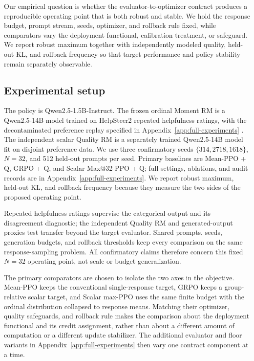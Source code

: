 \documentclass{article}
\theoremstyle{definition}
\theoremstyle{remark}
\begin{document}
Our empirical question is whether the evaluator-to-optimizer contract
produces a reproducible operating point that is both robust and stable.
We hold the response budget, prompt stream, seeds, optimizer, and rollback rule
fixed, while comparators vary the deployment functional, calibration
treatment, or safeguard. We report robust maximum together with
independently modeled quality, held-out KL, and rollback frequency so that target
performance and policy stability remain separately observable.

\subsection{Experimental setup}
The policy is Qwen2.5-1.5B-Instruct.  The frozen ordinal Moment RM is a
Qwen2.5-14B model trained on HelpSteer2 repeated helpfulness ratings, with the
decontaminated preference replay specified in Appendix~\ref{app:full-experiments}
\citep{wang2024helpsteer2}.  The independent scalar Quality RM is a separately
trained Qwen2.5-14B model fit on disjoint preference data.  We use
three confirmatory seeds \(\{314,2718,1618\}\), \(N=32\), and 512 held-out
prompts per seed.  Primary baselines are Mean-PPO + Q, GRPO + Q, and Scalar
Max@32-PPO + Q; full settings, ablations, and audit records are in
Appendix~\ref{app:full-experiments}.  We report robust maximum, held-out KL,
and rollback frequency because they measure the two sides of the proposed
operating point.

Repeated helpfulness ratings supervise the categorical output and its
disagreement diagnostic; the independent Quality RM and generated-output
proxies test transfer beyond the target evaluator.  Shared prompts, seeds,
generation budgets, and rollback thresholds keep every comparison on the same
response-sampling problem.  All confirmatory claims therefore concern this
fixed \(N=32\) operating point, not scale or budget generalization.

The primary comparators are chosen to isolate the two axes in the objective.
Mean-PPO keeps the conventional single-response target, GRPO keeps a
group-relative scalar target, and Scalar max-PPO uses the same finite budget
with the ordinal distribution collapsed to response means.  Matching their
optimizer, quality safeguards, and rollback rule makes the comparison about
the deployment functional and its credit assignment, rather than about a
different amount of computation or a different update stabilizer.  The
additional evaluator and floor variants in Appendix~\ref{app:full-experiments}
then vary one contract component at a time.
\end{document}

